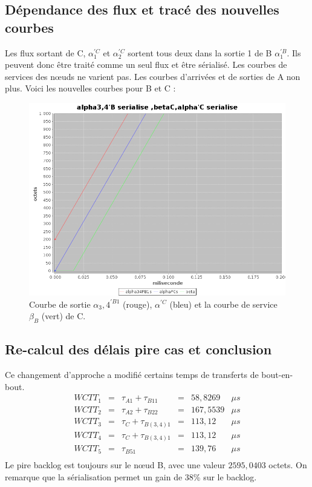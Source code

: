 \subsection{Dépendance des flux et tracé des nouvelles courbes}
Les flux sortant de C, $\alpha_1^{'C}$ et $\alpha_2^{'C}$ sortent tous deux dans la sortie 1 de B $\alpha_1^{'B}$. Ils peuvent donc être traité comme un seul flux et être sérialisé.
Les courbes de services des nœuds ne varient pas. Les courbes d'arrivées et de sorties de A non plus.
Voici les nouvelles courbes pour B et C :
\begin{figure}[!ht]%
\centering%
\noindent\includegraphics[width = .6\textwidth]{./II/images/alphaSerialise.png}%
\caption{\label{fig:alphaSerialise}Courbe de sortie $\alpha_3,4^{'B1}$ (rouge), $\alpha^{'C}$ (bleu) et la courbe de service $\beta_B$ (vert) de C.}%
\end{figure}

\subsection{Re-calcul des délais pire cas et conclusion}
Ce changement d'approche a modifié certains temps de transferts de bout-en-bout. 
\begin{equation}
\begin{array}{lclcll}
WCTT_1	&=&	\tau_{A1} + \tau_{B11} 	&=& 58,8269&\mu s\\
WCTT_2	&=&	\tau_{A2} + \tau_{B22} 	&=& 167,5539&\mu s\\
WCTT_3	&=&	\tau_{C} + \tau_{B(3,4)1} 	&=& 113,12&\mu s\\
WCTT_4	&=&	\tau_{C} + \tau_{B(3,4)1} &=& 113,12	&\mu s\\
WCTT_5	&=&	\tau_{B51} 				&=& 139,76	&\mu s\\
\end{array}
\end{equation}
Le pire backlog est toujours sur le n\oe ud B, avec une valeur $2595,0403$ octets.
On remarque que la sérialisation permet un gain de 38\% sur le backlog.

